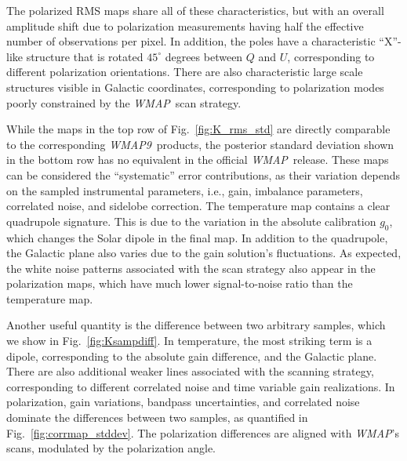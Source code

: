 \documentclass[twocolumn]{../../common/aa}
\def\WMAP{\emph{WMAP}}
\def\WMAPnine{\emph{WMAP9}}
\begin{document}
The polarized RMS maps share all of these characteristics, but with an overall amplitude shift due to polarization measurements having half the effective number of observations per pixel. In addition, the poles have a characteristic ``X''-like structure that is rotated $45^\circ$ degrees between $Q$ and $U$, corresponding to different polarization orientations. There are also characteristic large scale structures visible in Galactic coordinates, corresponding to polarization modes poorly constrained by the \WMAP\ scan strategy.

While the maps in the top row of Fig.~\ref{fig:K_rms_std} are directly comparable to the corresponding \WMAPnine\ products, the posterior standard deviation shown in the bottom row has no equivalent in the official \WMAP\ release. These maps can be considered the ``systematic'' error contributions, as their variation depends on the sampled instrumental parameters, i.e., gain, imbalance parameters, correlated noise, and sidelobe correction. The temperature map contains a clear quadrupole signature. This is due to the variation in the absolute calibration $g_0$, which changes the Solar dipole in the final map. In addition to the quadrupole, the Galactic plane also varies due to the gain solution's fluctuations. As expected, the white noise patterns associated with the scan strategy also appear in the polarization maps, which have much lower signal-to-noise ratio than the temperature map. %


Another useful quantity is the difference between two arbitrary samples, which we show in Fig.~\ref{fig:Ksampdiff}. In temperature, the most striking term is a dipole, corresponding to the absolute gain difference, and the Galactic plane. There are also additional weaker lines associated with the scanning strategy, corresponding to different correlated noise and time variable gain realizations. In polarization, gain variations,  bandpass uncertainties, and correlated noise dominate the differences between two samples, as quantified in Fig.~\ref{fig:corrmap_stddev}. The polarization differences are aligned with \WMAP's scans, modulated by the polarization angle.
\end{document}
